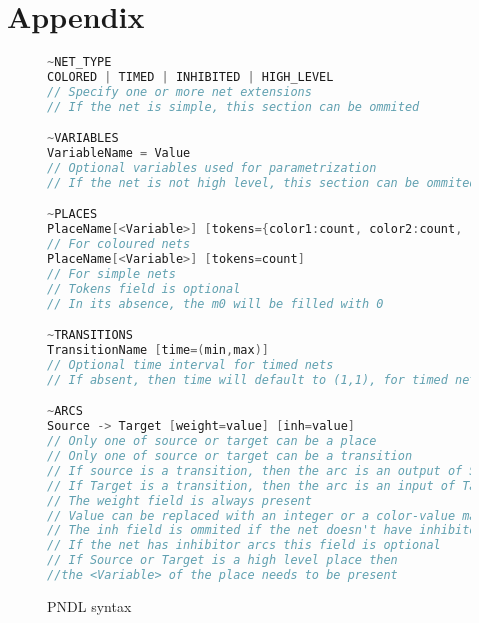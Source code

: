 \documentclass[12pt]{article}
\begin{document}
\section{Appendix}
    \begin{figure}[hbtp]
        \caption{PNDL syntax}
        \label{PNDLsyntax}
        \begin{lstlisting}[language=C,frame=single]
~NET_TYPE
COLORED | TIMED | INHIBITED | HIGH_LEVEL   
// Specify one or more net extensions
// If the net is simple, this section can be ommited

~VARIABLES
VariableName = Value                                 
// Optional variables used for parametrization
// If the net is not high level, this section can be ommited

~PLACES
PlaceName[<Variable>] [tokens={color1:count, color2:count, ...}]
// For coloured nets
PlaceName[<Variable>] [tokens=count]
// For simple nets
// Tokens field is optional
// In its absence, the m0 will be filled with 0

~TRANSITIONS
TransitionName [time=(min,max)]                      
// Optional time interval for timed nets
// If absent, then time will default to (1,1), for timed nets

~ARCS
Source -> Target [weight=value] [inh=value]
// Only one of source or target can be a place
// Only one of source or target can be a transition
// If source is a transition, then the arc is an output of Source
// If Target is a transition, then the arc is an input of Target
// The weight field is always present
// Value can be replaced with an integer or a color-value map
// The inh field is ommited if the net doesn't have inhibitor arcs
// If the net has inhibitor arcs this field is optional
// If Source or Target is a high level place then 
//the <Variable> of the place needs to be present
        \end{lstlisting}
    \end{figure}
\end{document}
